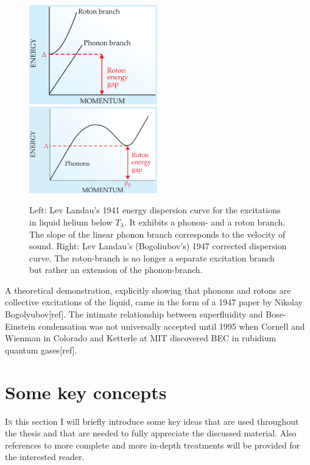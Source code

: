\documentclass[12pt,a4paper]{book}
\begin{document}
		\begin{figure}[t]
			\begin{center}
				\includegraphics[width=0.495\textwidth]{phonon-roton-landau-first}
				\includegraphics[width=0.495\textwidth]{phonon-roton-bogoliubov}
			\end{center}
			\caption{Left: Lev Landau's 1941 energy dispersion curve for the excitations in liquid helium below $T_\lambda$. It exhibits a phonon- and a roton branch. The slope of the linear phonon branch corresponds to the velocity of sound. Right: Lev Landau's (Bogoliubov's) 1947 corrected dispersion curve. The roton-branch is no longer a separate excitation branch but rather an extension of the phonon-branch.}
			\label{fig:phonon-roton}
		\end{figure}

		A theoretical demonstration, explicitly showing that phonons and rotons are collective excitations of the liquid, came in the form of a 1947 paper by Nikolay Bogolyubov[ref]. The intimate relationship between superfluidity and Bose-Einstein condensation was not universally accepted until 1995 when Cornell and Wienman in Colorado and Ketterle at MIT discovered BEC in rubidium quantum gases[ref].

	\clearpage		
	\section{Some key concepts}
	\lettrine[lines=3,findent=3pt,nindent=0pt]{I}{n} this section I will briefly introduce some key ideas that are used throughout the thesis and that are needed to fully appreciate the discussed material. Also references to more complete and more in-depth treatments will be provided for the interested reader.
		
\end{document}
